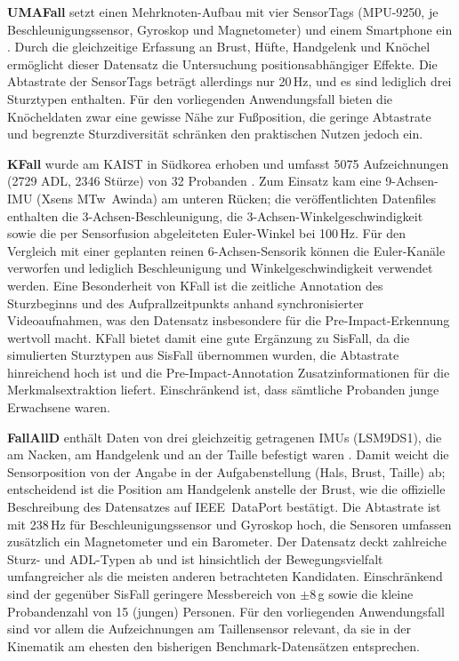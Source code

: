 \documentclass[11pt,a4paper,oneside]{report}
\begin{document}
\textbf{UMAFall} setzt einen Mehrknoten-Aufbau mit vier SensorTags
(MPU-9250, je Beschleunigungssensor, Gyroskop und Magnetometer) und einem
Smartphone ein \cite{umafall2017}. Durch die gleichzeitige Erfassung an Brust,
Hüfte, Handgelenk und Knöchel ermöglicht dieser Datensatz die
Untersuchung positionsabhängiger Effekte. Die Abtastrate der SensorTags
beträgt allerdings nur 20\,Hz, und es sind lediglich drei Sturztypen
enthalten. Für den vorliegenden Anwendungsfall bieten die Knöcheldaten
zwar eine gewisse Nähe zur Fußposition, die geringe Abtastrate und
begrenzte Sturzdiversität schränken den praktischen Nutzen jedoch ein.

\textbf{KFall} wurde am KAIST in Südkorea erhoben und umfasst 5075
Aufzeichnungen (2729 ADL, 2346 Stürze) von 32 Probanden
\cite{kfall2021}. Zum Einsatz kam eine 9-Achsen-IMU (Xsens MTw~Awinda) am
unteren Rücken; die veröffentlichten Datenfiles enthalten die
3-Achsen-Beschleunigung, die 3-Achsen-Winkelgeschwindigkeit sowie die per
Sensorfusion abgeleiteten Euler-Winkel bei 100\,Hz. Für den Vergleich
mit einer geplanten reinen 6-Achsen-Sensorik können die Euler-Kanäle
verworfen und lediglich Beschleunigung und Winkelgeschwindigkeit
verwendet werden. Eine Besonderheit von KFall ist die zeitliche
Annotation des Sturzbeginns und des Aufprallzeitpunkts anhand
synchronisierter Videoaufnahmen, was den Datensatz insbesondere für die
Pre-Impact-Erkennung wertvoll macht. KFall bietet damit eine gute
Ergänzung zu SisFall, da die simulierten Sturztypen aus SisFall
übernommen wurden, die Abtastrate hinreichend hoch ist und die
Pre-Impact-Annotation Zusatzinformationen für die Merkmalsextraktion
liefert. Einschränkend ist, dass sämtliche Probanden junge Erwachsene
waren.

\textbf{FallAllD} enthält Daten von drei gleichzeitig getragenen IMUs
(LSM9DS1), die am Nacken, am Handgelenk und an der Taille befestigt waren
\cite{fallalld2020}. Damit weicht die Sensorposition von der Angabe
in der Aufgabenstellung (Hals, Brust, Taille) ab; entscheidend ist die Position
am Handgelenk anstelle der Brust, wie die offizielle Beschreibung des
Datensatzes auf IEEE~DataPort bestätigt. Die Abtastrate ist mit 238\,Hz
für Beschleunigungssensor und Gyroskop hoch, die Sensoren umfassen zusätzlich
ein Magnetometer und ein Barometer. Der Datensatz deckt zahlreiche Sturz-
und ADL-Typen ab und ist hinsichtlich der Bewegungsvielfalt umfangreicher
als die meisten anderen betrachteten Kandidaten. Einschränkend sind der
gegenüber SisFall geringere Messbereich von $\pm 8$\,g sowie die kleine
Probandenzahl von 15 (jungen) Personen. Für den vorliegenden Anwendungsfall
sind vor allem die Aufzeichnungen am Taillensensor relevant, da sie in der
Kinematik am ehesten den bisherigen Benchmark-Datensätzen entsprechen.
\end{document}
